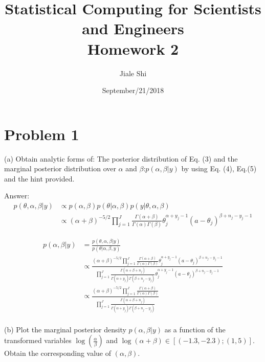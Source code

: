 \documentclass{article}
\title{Statistical Computing for Scientists and Engineers\\[1em] Homework 2}
\author{Jiale Shi}
\date{September/21/2018}
\begin{document}
\maketitle

\newpage
\section{Problem 1}
(a) Obtain analytic forms of:
The posterior distribution of Eq. (3) and the marginal posterior distribution over $\alpha$ and $\beta$:$p(\alpha,\beta|y)$ by using Eq. (4), Eq.(5) and the hint provided.

Answer:
\begin{equation}
\begin{aligned}
    p(\theta,\alpha,\beta|y) & \propto p(\alpha,\beta) p(\theta|\alpha,\beta)p(y|\theta,\alpha,\beta) \\
    & \propto (\alpha+\beta)^{-5/2}\prod_{j=1}^{J} \frac{\Gamma(\alpha+\beta)}{\Gamma(\alpha)\Gamma(\beta)}\theta_{j}^{\alpha+y_{j}-1}(a-\theta_{j})^{\beta+n_{j}-y_{j}-1}
\end{aligned}
\end{equation}

\begin{equation}
\begin{aligned}
    p(\alpha,\beta|y) & = \frac{ p(\theta,\alpha,\beta|y)}{ p(\theta|\alpha,\beta,y)} \\
    & \propto \frac{(\alpha+\beta)^{-5/2}\prod_{j=1}^{J} \frac{\Gamma(\alpha+\beta)}{\Gamma(\alpha)\Gamma(\beta)}\theta_{j}^{\alpha+y_{j}-1}(a-\theta_{j})^{\beta+n_{j}-y_{j}-1}}{ \prod_{j=1}^{J} \frac{\Gamma(\alpha+\beta+n_{j})}{\Gamma(\alpha+y_{j})\Gamma(\beta+n_{j}-y_{j})}\theta_{j}^{\alpha+y_{j}-1}(a-\theta_{j})^{\beta+n_{j}-y_{j}-1} } \\
     & \propto \frac{(\alpha+\beta)^{-5/2}\prod_{j=1}^{J} \frac{\Gamma(\alpha+\beta)}{\Gamma(\alpha)\Gamma(\beta)}}{ \prod_{j=1}^{J} \frac{\Gamma(\alpha+\beta+n_{j})}{\Gamma(\alpha+y_{j})\Gamma(\beta+n_{j}-y_{j})}} \\
\end{aligned}
\end{equation}

(b) Plot the marginal posterior density $p(\alpha,\beta|y)$ as a function of the transformed variables $\log(\frac{\alpha}{\beta})$ and $\log(\alpha+\beta) \in [(-1.3,-2.3);(1,5)]$. Obtain the corresponding value of $(\alpha,\beta)$.
\end{document}
